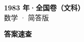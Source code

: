 \documentclass[zihao=-4, a4paper]{ctexart}
\begin{document}
\begin{center}
  {\Large\bfseries 1983 年·全国卷（文科）}\\[4pt]
  {\large 数学 · 简答版}
\end{center}
\medskip
{}

\clearpage
{}
\begin{center}{\Large\bfseries 答案速查}\end{center}
\medskip

\end{document}
